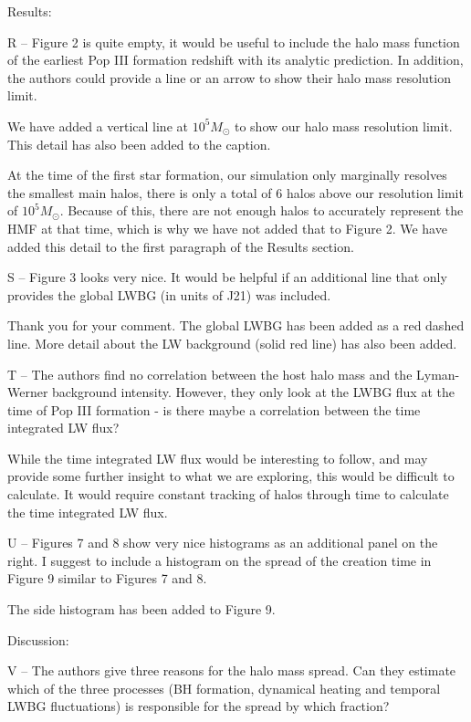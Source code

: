 \documentclass[11pt]{article}
\newenvironment{referee}[1][]{%
    \ignorespaces%
    \begin{mdframed}[style=myquotestyle,#1]%
}{%
    \end{mdframed}%
    \ignorespacesafterend%
}%
\begin{document}
\begin{referee}
Results:

R -- Figure 2 is quite empty, it would be useful to include the halo mass function of the earliest Pop III formation redshift with its analytic prediction. In addition, the authors could provide a line or an arrow to show their halo mass resolution limit.
\end{referee}
We have added a vertical line at $10^5 M_{\odot}$ to show our halo mass resolution limit. This detail has also been added to the caption.

At the time of the first star formation, our simulation only marginally resolves the smallest main halos, there is only a total of 6 halos above our resolution limit of $10^{5} M_{\odot}$. Because of this, there are not enough halos to accurately represent the HMF at that time, which is why we have not added that to Figure 2. We have added this detail to the first paragraph of the Results section. 

\begin{referee}
S -- Figure 3 looks very nice. It would be helpful if an additional line that only 
provides the global LWBG (in units of J21) was included.
\end{referee}
Thank you for your comment. The global LWBG has been added as a red dashed line. More detail about the LW background (solid red line) has also been added.

\begin{referee}
T -- The authors find no correlation between the host halo mass and the Lyman-Werner background intensity. However, they only look at the LWBG flux at the time of Pop III formation - is there maybe a correlation between the time integrated LW flux?
\end{referee}
While the time integrated LW flux would be interesting to follow, and may provide some further insight to what we are exploring, this would be difficult to calculate. It would require constant tracking of halos through time to calculate the time integrated LW flux. 

\begin{referee}
U -- Figures 7 and 8 show very nice histograms as an additional panel on the right.  I suggest to include a histogram on the spread of the creation time in Figure 9 similar to Figures 7 and 8.
\end{referee}
The side histogram has been added to Figure 9. 

\begin{referee}
Discussion:

V -- The authors give three reasons for the halo mass spread. Can they estimate which of the three processes (BH formation, dynamical heating and temporal LWBG fluctuations) is responsible for the spread by which fraction?
\end{referee}
\end{document}
